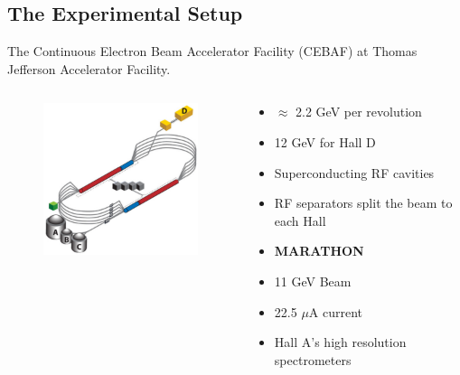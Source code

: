 \documentclass[12pt]{beamer}
\begin{document}
\subsection[Equipment]{The Experimental Setup}

\begin{frame}
The Continuous Electron Beam Accelerator Facility (CEBAF) at Thomas Jefferson Accelerator Facility.\\

\vspace{-10pt}
\begin{columns}[c]
		\begin{figure}
			\includegraphics[width=5.5cm]{../images/cebaf.pdf}
		\end{figure}
		\begin{block}{}
			\begin{itemize}
				\addtolength{\itemindent}{-1em}
				\item $\approx$ 2.2 GeV per revolution
				\item 12 GeV for Hall D
				\item Superconducting RF cavities
				\item RF separators split the beam to each Hall
				\item [] \hspace{-15pt}\textbf{MARATHON }
				\item 11 GeV Beam	
				\item 22.5 $\mu$A current
				\item Hall A's high resolution spectrometers
			\end{itemize}
		\end{block}
\end{columns}
\end{frame}
\end{document}
